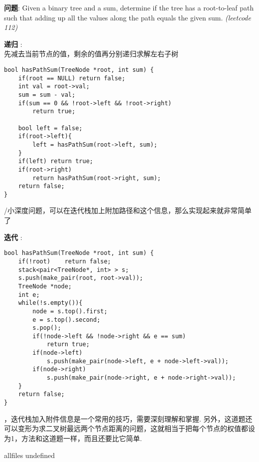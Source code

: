 \documentclass{article}
\begin{document}
\begin{CJK}{UTF8}{gbsn}     %

\else
    
\begin{description}
    \item{\textbf{问题}}: Given a binary tree and a sum, determine if the tree has a root-to-leaf path such that adding up all the values along the path equals the given sum. \textit{(leetcode 112)}
    \item{\textbf{递归}} : 
    \\先减去当前节点的值，剩余的值再分别递归求解左右子树
    \begin{lstlisting}
bool hasPathSum(TreeNode *root, int sum) {
    if(root == NULL) return false;
    int val = root->val;
    sum = sum - val;
    if(sum == 0 && !root->left && !root->right)
        return true;

    bool left = false; 
    if(root->left){
        left = hasPathSum(root->left, sum);    
    }
    if(left) return true;
    if(root->right)
        return hasPathSum(root->right, sum);
    return false;
}
    \end{lstlisting}
    /小深度问题，可以在迭代栈加上附加路径和这个信息，那么实现起来就非常简单了
    \item{\textbf{迭代}} : 
    \begin{lstlisting}
bool hasPathSum(TreeNode *root, int sum) {
    if(!root)    return false;
    stack<pair<TreeNode*, int> > s;
    s.push(make_pair(root, root->val));
    TreeNode *node;
    int e;
    while(!s.empty()){
        node = s.top().first;
        e = s.top().second;
        s.pop();
        if(!node->left && !node->right && e == sum)
            return true;
        if(node->left)
            s.push(make_pair(node->left, e + node->left->val));
        if(node->right)
            s.push(make_pair(node->right, e + node->right->val));
    }
    return false;
}
    \end{lstlisting}
    ，迭代栈加入附件信息是一个常用的技巧，需要深刻理解和掌握. 另外，这道题还可以变形为求二叉树最远两个节点距离的问题，这就相当于把每个节点的权值都设为1，方法和这道题一样，而且还要比它简单.
\end{description}

\fi

\ifx allfiles undefined
\end{CJK}
\end{document}
